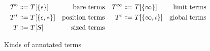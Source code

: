 \begin{figure}
\begin{align*}
T^\circ  &\Coloneqq T[\{\epsilon\}]      &\text{bare terms}     &&T^\infty &\Coloneqq T[\{\infty\}]        &\text{limit terms} \\
T^*      &\Coloneqq T[\{\epsilon, *\}]   &\text{position terms} &&T^\iota  &\Coloneqq T[\{\infty, \iota\}] &\text{global terms} \\
T        &\Coloneqq T[S]                   &\text{sized terms}
\end{align*}
\caption{Kinds of annotated terms}
\label{fig:terms-specific}
\end{figure}
